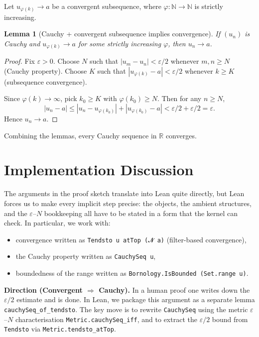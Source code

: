 \documentclass[11pt]{article}
\newtheorem{lemma}{Lemma}
\begin{document}
Let \(u_{\varphi(k)} \to a\) be a convergent subsequence, where \(\varphi:\mathbb{N}\to\mathbb{N}\) is strictly increasing.

\begin{lemma}[Cauchy + convergent subsequence implies convergence]
If \((u_n)\) is Cauchy and \(u_{\varphi(k)}\to a\) for some strictly increasing \(\varphi\),
then \(u_n\to a\).
\end{lemma}

\begin{proof}
Fix \(\varepsilon>0\).
Choose \(N\) such that \(|u_m-u_n|<\varepsilon/2\) whenever \(m,n\ge N\) (Cauchy property).
Choose \(K\) such that \(|u_{\varphi(k)}-a|<\varepsilon/2\) whenever \(k\ge K\) (subsequence convergence).

Since \(\varphi(k)\to\infty\), pick \(k_0\ge K\) with \(\varphi(k_0)\ge N\).
Then for any \(n\ge N\),
\[
|u_n-a|
\le |u_n-u_{\varphi(k_0)}| + |u_{\varphi(k_0)}-a|
< \varepsilon/2 + \varepsilon/2
= \varepsilon.
\]
Hence \(u_n\to a\).
\end{proof}

Combining the lemmas, every Cauchy sequence in \(\mathbb{R}\) converges.

\section{Implementation Discussion}

\noindent
The arguments in the proof sketch translate into Lean quite directly, but Lean forces us to make every implicit step precise: the objects, the ambient structures, and the \(\varepsilon\)--\(N\) bookkeeping all have to be stated in a form that the kernel can check.
In particular, we work with:
\begin{itemize}
  \item convergence written as \texttt{Tendsto u atTop (𝓝 a)} (filter-based convergence),
  \item the Cauchy property written as \texttt{CauchySeq u},
  \item boundedness of the range written as \texttt{Bornology.IsBounded (Set.range u)}.
\end{itemize}

\medskip
\noindent
\textbf{Direction (Convergent \(\Rightarrow\) Cauchy).}
In a human proof one writes down the \(\varepsilon/2\) estimate and is done. In Lean, we package this argument as a separate lemma \verb|cauchySeq_of_tendsto|. The key move is to rewrite \verb|CauchySeq| using the metric \(\varepsilon\)--\(N\) characterisation \verb|Metric.cauchySeq_iff|, and to extract the \(\varepsilon/2\) bound from \verb|Tendsto| via \verb|Metric.tendsto_atTop|.
\end{document}
